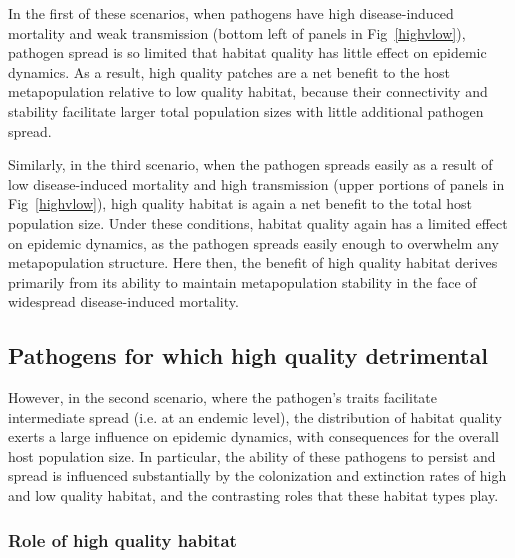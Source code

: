 \documentclass{article}
\begin{document}
In the first of these scenarios, when pathogens have high disease-induced mortality and weak transmission (bottom left of panels in Fig~\ref{highvlow}), pathogen spread is so limited that habitat quality has little effect on epidemic dynamics.
As a result, high quality patches are a net benefit to the host metapopulation relative to low quality habitat, because their connectivity and stability facilitate larger total population sizes with little additional pathogen spread.

Similarly, in the third scenario, when the pathogen spreads easily as a result of low disease-induced mortality and high transmission (upper portions of panels in Fig~\ref{highvlow}), high quality habitat is again a net benefit to the total host population size.  
Under these conditions, habitat quality again has a limited effect on epidemic dynamics, as the pathogen spreads easily enough to overwhelm any metapopulation structure.
Here then, the benefit of high quality habitat derives primarily from its ability to maintain metapopulation stability in the face of widespread disease-induced mortality.

\subsection*{Pathogens for which high quality detrimental}

However, in the second scenario, where the pathogen's traits facilitate intermediate spread (i.e. at an endemic level), the distribution of habitat quality exerts a large influence on epidemic dynamics, with consequences for the overall host population size.
In particular, the ability of these pathogens to persist and spread is influenced substantially by the colonization and extinction rates of high and low quality habitat, and the contrasting roles that these habitat types play.
 

\subsubsection*{Role of high quality habitat}
\end{document}
